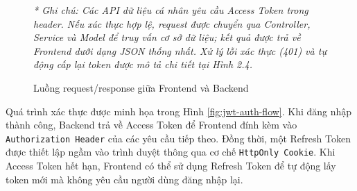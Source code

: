 \documentclass[12pt, a4paper]{report}
\begin{document}
\begin{figure}[htbp]
{
    }
    \caption{Luồng request/response giữa Frontend và Backend}
    \label{fig:api_flow}
    
    \vspace{0.2cm}
    \small \textit{* Ghi chú: Các API dữ liệu cá nhân yêu cầu Access Token trong header. Nếu xác thực hợp lệ, request được chuyển qua Controller, Service và Model để truy vấn cơ sở dữ liệu; kết quả được trả về Frontend dưới dạng JSON thống nhất. Xử lý lỗi xác thực (401) và tự động cấp lại token được mô tả chi tiết tại Hình 2.4.}
\end{figure}

Quá trình xác thực được minh họa trong Hình \ref{fig:jwt-auth-flow}. Khi đăng nhập thành công, Backend trả về Access Token để Frontend đính kèm vào \texttt{Authorization Header} của các yêu cầu tiếp theo. Đồng thời, một Refresh Token được thiết lập ngầm vào trình duyệt thông qua cơ chế \texttt{HttpOnly Cookie}. Khi Access Token hết hạn, Frontend có thể sử dụng Refresh Token để tự động lấy token mới mà không yêu cầu người dùng đăng nhập lại.
\end{document}
